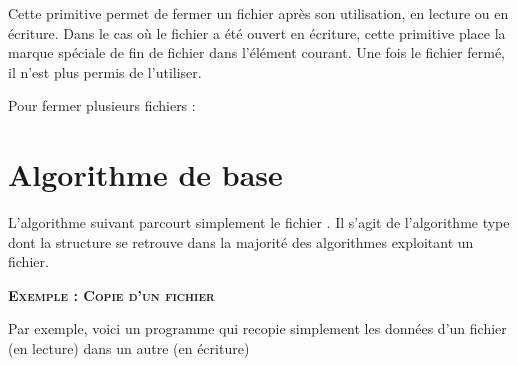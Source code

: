 Cette primitive permet de fermer un fichier après son utilisation, en
lecture ou en écriture. Dans le cas où le fichier a été ouvert en
écriture, cette primitive place la marque spéciale de fin de fichier
dans l’élément courant. Une fois le fichier fermé, il
n'est plus permis de l'utiliser.

Pour fermer plusieurs fichiers :



\section{Algorithme de base}

L’algorithme suivant parcourt simplement le fichier
. Il s’agit de l’algorithme type dont la
structure se retrouve dans la majorité des algorithmes exploitant un
fichier.


\bigskip

{\sffamily\bfseries\scshape
Exemple : Copie d'un fichier}

Par exemple, voici un programme qui recopie simplement les données
d'un fichier (en lecture) dans un autre (en écriture)



